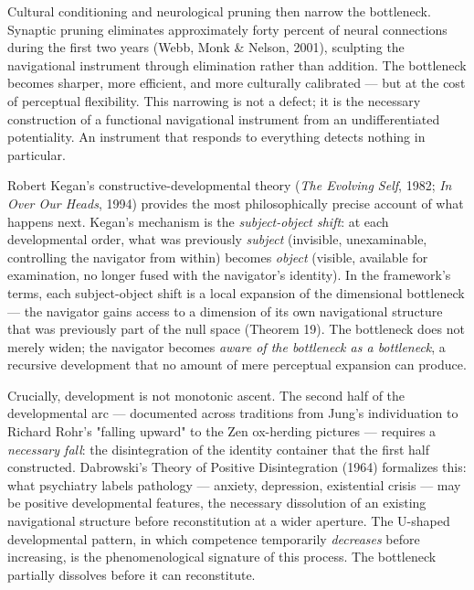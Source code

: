 Cultural conditioning and neurological pruning then narrow the bottleneck. Synaptic pruning eliminates approximately forty percent of neural connections during the first two years (Webb, Monk \& Nelson, 2001), sculpting the navigational instrument through elimination rather than addition. The bottleneck becomes sharper, more efficient, and more culturally calibrated — but at the cost of perceptual flexibility. This narrowing is not a defect; it is the necessary construction of a functional navigational instrument from an undifferentiated potentiality. An instrument that responds to everything detects nothing in particular.


Robert Kegan's constructive-developmental theory (\textit{The Evolving Self}, 1982; \textit{In Over Our Heads}, 1994) provides the most philosophically precise account of what happens next. Kegan's mechanism is the \textit{subject-object shift}: at each developmental order, what was previously \textit{subject} (invisible, unexaminable, controlling the navigator from within) becomes \textit{object} (visible, available for examination, no longer fused with the navigator's identity). In the framework's terms, each subject-object shift is a local expansion of the dimensional bottleneck — the navigator gains access to a dimension of its own navigational structure that was previously part of the null space (Theorem 19). The bottleneck does not merely widen; the navigator becomes \textit{aware of the bottleneck as a bottleneck}, a recursive development that no amount of mere perceptual expansion can produce.


Crucially, development is not monotonic ascent. The second half of the developmental arc — documented across traditions from Jung's individuation to Richard Rohr's "falling upward" to the Zen ox-herding pictures — requires a \textit{necessary fall}: the disintegration of the identity container that the first half constructed. Dabrowski's Theory of Positive Disintegration (1964) formalizes this: what psychiatry labels pathology — anxiety, depression, existential crisis — may be positive developmental features, the necessary dissolution of an existing navigational structure before reconstitution at a wider aperture. The U-shaped developmental pattern, in which competence temporarily \textit{decreases} before increasing, is the phenomenological signature of this process. The bottleneck partially dissolves before it can reconstitute.


